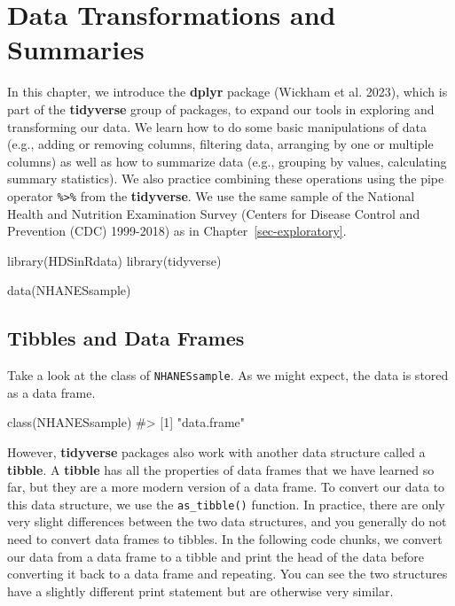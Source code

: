 \documentclass[
  letterpaper,
]{latex/krantz}
\makeatletter
\newenvironment{Shaded}{\begin{snugshade}}{\end{snugshade}}
\newcommand{\CommentTok}[1]{\textcolor[rgb]{0.37,0.37,0.37}{#1}}
\newcommand{\FunctionTok}[1]{\textcolor[rgb]{0.28,0.35,0.67}{#1}}
\newcommand{\NormalTok}[1]{\textcolor[rgb]{0.00,0.23,0.31}{#1}}
\newenvironment{kframe}{%
\medskip{}
\setlength{\fboxsep}{.8em}
 \def\at@end@of@kframe{}%
 \ifinner\ifhmode%
  \def\at@end@of@kframe{\end{minipage}}%
  \begin{minipage}{\columnwidth}%
 \fi\fi%
 \def\FrameCommand##1{\hskip\@totalleftmargin \hskip-\fboxsep
 \colorbox{shadecolor}{##1}\hskip-\fboxsep
     \hskip-\linewidth \hskip-\@totalleftmargin \hskip\columnwidth}%
 \MakeFramed {\advance\hsize-\width
   \@totalleftmargin\z@ \linewidth\hsize
   \@setminipage}}%
 {\par\unskip\endMakeFramed%
 \at@end@of@kframe}
\renewenvironment{Shaded}{\begin{kframe}}{\end{kframe}}
\makeatother
\begin{document}
\chapter{Data Transformations and
Summaries}\label{sec-transformations-summaries}

In this chapter, we introduce the \textbf{dplyr}
package (Wickham et al. 2023), which is part of the
\textbf{tidyverse} group of packages, to
expand our tools in exploring and transforming our data. We learn how to
do some basic manipulations of data (e.g., adding or removing columns,
filtering data, arranging by one or multiple columns) as well as how to
summarize data (e.g., grouping by values, calculating summary
statistics). We also practice combining these operations using the pipe
operator \texttt{\%\textgreater{}\%} from the \textbf{tidyverse}. We use
the same sample of the National Health and Nutrition Examination Survey
(Centers for Disease Control and Prevention (CDC) 1999-2018)
 as in
Chapter~\ref{sec-exploratory}.

\begin{Shaded}
\begin{Highlighting}[]
\FunctionTok{library}\NormalTok{(HDSinRdata)}
\FunctionTok{library}\NormalTok{(tidyverse)}

\FunctionTok{data}\NormalTok{(NHANESsample)}
\end{Highlighting}
\end{Shaded}

\section{Tibbles and Data Frames}\label{tibbles-and-data-frames}

Take a look at the class of \texttt{NHANESsample}. As we might expect,
the data is stored as a data frame.

\begin{Shaded}
\begin{Highlighting}[]
\FunctionTok{class}\NormalTok{(NHANESsample)}
\CommentTok{\#\textgreater{} [1] "data.frame"}
\end{Highlighting}
\end{Shaded}

However, \textbf{tidyverse} packages also work with another data
structure called a \textbf{tibble}. A \textbf{tibble} has
all the properties of data frames that we have learned so far, but they
are a more modern version of a data frame. To convert our data to this
data structure, we use the
\texttt{as\_tibble()}
function. In practice, there are only very slight differences between
the two data structures, and you generally do not need to convert data
frames to tibbles. In the following code chunks, we convert our data
from a data frame to a tibble and print the head of the data before
converting it back to a data frame and repeating. You can see the two
structures have a slightly different print statement but are otherwise
very similar.
\end{document}
